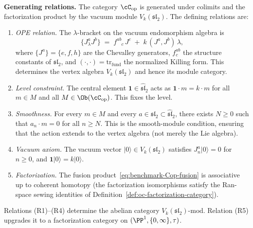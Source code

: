 \begin{definition}
\medskip\noindent
\textbf{Generating relations.}
The category $\cC_{\mathrm{op}}$ is generated under colimits
and the factorization product by the vacuum module
$V_k(\mathfrak{sl}_2)$. The defining relations are:
\begin{enumerate}[label=\textup{(R\arabic*)},nosep]
\item \emph{OPE relation.}
 The $\lambda$-bracket on the vacuum endomorphism algebra is
 \begin{equation}\label{eq:benchmark-sl2-ope}
 \{J^a_\lambda J^b\}
 \;=\;
 f^{ab}_{\phantom{ab}c}\, J^c
 \;+\;
 k\, (J^a, J^b)\, \lambda,
 \end{equation}
 where $\{J^a\} = \{e, f, h\}$ are the Chevalley generators,
 $f^{ab}_c$ the structure constants of $\mathfrak{sl}_2$, and
 $(\cdot,\cdot) = \mathrm{tr}_{\mathrm{fund}}$ the normalized
 Killing form. This determines the vertex algebra
 $V_k(\mathfrak{sl}_2)$ and hence its module category.

\item \emph{Level constraint.}
 The central element $\mathbf{1} \in
 \widehat{\mathfrak{sl}}_2$ acts as
 $\mathbf{1} \cdot m = k \cdot m$ for all $m \in M$ and
 all $M \in \Ob(\cC_{\mathrm{op}})$. This fixes the level.

\item \emph{Smoothness.}
 For every $m \in M$ and every
 $a \in \mathfrak{sl}_2 \subset \widehat{\mathfrak{sl}}_2$,
 there exists $N \ge 0$ such that
 $a_n \cdot m = 0$ for all $n \ge N$. This is the smooth-module
 condition, ensuring that the action extends to the vertex
 algebra (not merely the Lie algebra).

\item \emph{Vacuum axiom.}
 The vacuum vector $|0\rangle \in V_k(\mathfrak{sl}_2)$
 satisfies $J^a_n |0\rangle = 0$ for $n \ge 0$, and
 $\mathbf{1} |0\rangle = k |0\rangle$.

\item \emph{Factorization.}
 The fusion product~\eqref{eq:benchmark-Cop-fusion} is
 associative up to coherent homotopy (the factorization
 isomorphisms satisfy the Ran-space sewing identities of
 Definition~\ref{def:oc-factorization-category}).
\end{enumerate}
Relations (R1)--(R4) determine the abelian category
$V_k(\mathfrak{sl}_2)\text{-mod}$. Relation (R5) upgrades
it to a factorization category on
$(\PP^1, \{0,\infty\}, \tau)$.
\end{definition}

